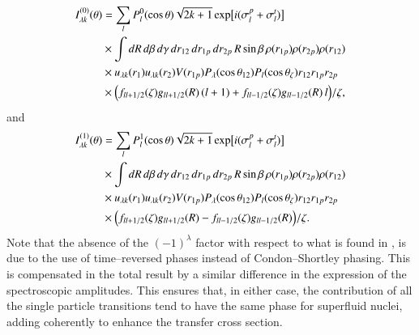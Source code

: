 \begin{equation}\label{eq111}
  \begin{split}
  I_{\lambda k}^{(0)}(\theta)&=\sum_{l}P_l^0(\cos\theta)
  \sqrt{2k+1}\exp\bigl[i(\sigma_{l}^p+\sigma_{l}^t)\bigr]\\
  &\times  \int dR \, d\beta\, d\gamma \, dr_{12}\,dr_{1p}\,dr_{2p}\,R\sin\beta\,\rho(r_{1p})\rho(r_{2p})\rho(r_{12})   \\
  &\times u_{\lambda k}(r_1)u_{\lambda k}(r_2)V(r_{1p})
  P_\lambda(\cos \theta_{12})P_l(\cos \theta_\zeta)r_{12}r_{1p}r_{2p}\\
  &\times \Bigl(f_{ll+1/2}(\zeta)g_{ll+1/2}(R)\,(l+1)+f_{ll-1/2}(\zeta)g_{ll-1/2}(R)\,l\Bigr)/\zeta,
  \end{split}
\end{equation}
and
\begin{equation}\label{eq112}
  \begin{split}
  I_{\lambda k}^{(1)}(\theta)&=\sum_{l}P_l^1(\cos\theta)
  \sqrt{2k+1}\exp\bigl[i(\sigma_{l}^p+\sigma_{l}^t)\bigr]\\
  &\times  \int dR \, d\beta\, d\gamma \, dr_{12}\,dr_{1p}\,dr_{2p}\,R\sin\beta \,\rho(r_{1p})\rho(r_{2p})\rho(r_{12})  \\
  &\times u_{\lambda k}(r_1)u_{\lambda k}(r_2)V(r_{1p})
  P_\lambda(\cos \theta_{12})P_l(\cos \theta_\zeta)r_{12}r_{1p}r_{2p}\\
  &\times \Bigl(f_{ll+1/2}(\zeta)g_{ll+1/2}(R)-f_{ll-1/2}(\zeta)g_{ll-1/2}(R)\Bigr)/\zeta.
  \end{split}
\end{equation}
Note that the absence of the $(-1)^\lambda$ factor with respect to what is found in \cite{Bayman:71}, is due to the use of time--reversed phases instead of Condon--Shortley phasing. This is compensated in the total result by a similar difference in the expression of the spectroscopic amplitudes. This ensures that, in either case, the contribution of all the single particle transitions tend to have the same phase for superfluid nuclei, adding coherently to enhance the transfer cross section.
